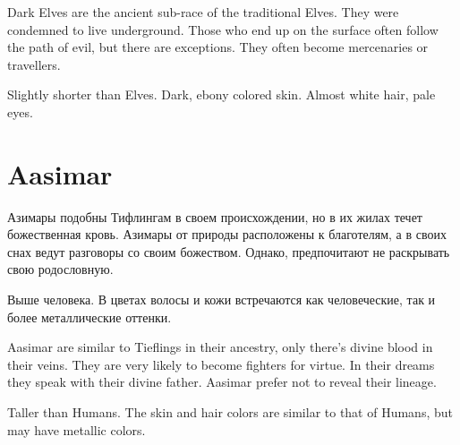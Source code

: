 \documentclass[a5paper,11pt]{book}
\begin{document}
\begin{multicols}{2}
\begin{en}
  Dark Elves are the ancient sub-race of the traditional Elves. They were condemned to live underground. Those who end up on the surface often follow the path of evil, but there are exceptions. They often become mercenaries or travellers.

Slightly shorter than Elves. Dark, ebony colored skin. Almost white hair, pale eyes.
\end{en}

\section{Aasimar}
\begin{ru}
Азимары подобны Тифлингам в своем происхождении, но в их жилах течет божественная кровь.  Азимары от природы расположены к благотелям, а в своих снах ведут разговоры со своим божеством. Однако, предпочитают не раскрывать свою родословную.

Выше человека. В цветах волосы и кожи встречаются как человеческие, так и более металлические оттенки.
\end{ru}

\begin{en}
Aasimar are similar to Tieflings in their ancestry, only there's divine blood in their veins. They are very likely to become fighters for virtue. In their dreams they speak with their divine father. Aasimar prefer not to reveal their lineage.

Taller than Humans. The skin and hair colors are similar to that of Humans, but may have metallic colors.
\end{en}
\end{multicols}

\end{document}
